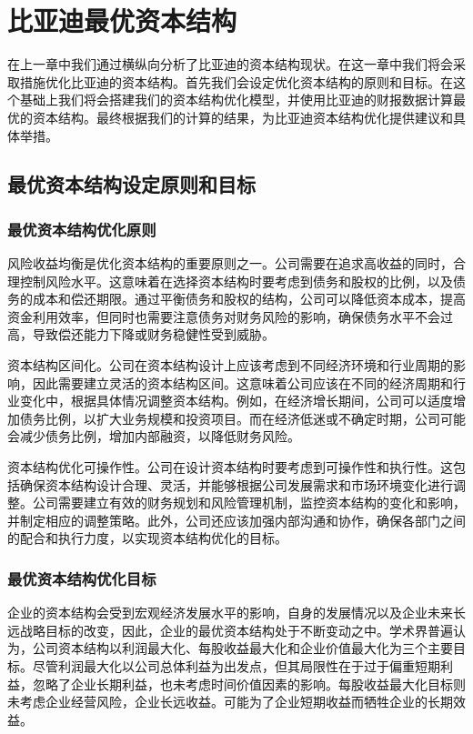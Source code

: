 \chapter{比亚迪最优资本结构}
在上一章中我们通过横纵向分析了比亚迪的资本结构现状。在这一章中我们将会采取措施优化比亚迪的资本结构。首先我们会设定优化资本结构的原则和目标。在这个基础上我们将会搭建我们的资本结构优化模型，并使用比亚迪的财报数据计算最优的资本结构。最终根据我们的计算的结果，为比亚迪资本结构优化提供建议和具体举措。
\section{最优资本结构设定原则和目标}
\subsection{最优资本结构优化原则}
风险收益均衡是优化资本结构的重要原则之一。公司需要在追求高收益的同时，合理控制风险水平。这意味着在选择资本结构时要考虑到债务和股权的比例，以及债务的成本和偿还期限。通过平衡债务和股权的结构，公司可以降低资本成本，提高资金利用效率，但同时也需要注意债务对财务风险的影响，确保债务水平不会过高，导致偿还能力下降或财务稳健性受到威胁。

资本结构区间化。公司在资本结构设计上应该考虑到不同经济环境和行业周期的影响，因此需要建立灵活的资本结构区间。这意味着公司应该在不同的经济周期和行业变化中，根据具体情况调整资本结构。例如，在经济增长期间，公司可以适度增加债务比例，以扩大业务规模和投资项目。而在经济低迷或不确定时期，公司可能会减少债务比例，增加内部融资，以降低财务风险。

资本结构优化可操作性。公司在设计资本结构时要考虑到可操作性和执行性。这包括确保资本结构设计合理、灵活，并能够根据公司发展需求和市场环境变化进行调整。公司需要建立有效的财务规划和风险管理机制，监控资本结构的变化和影响，并制定相应的调整策略。此外，公司还应该加强内部沟通和协作，确保各部门之间的配合和执行力度，以实现资本结构优化的目标。
\subsection{最优资本结构优化目标}
企业的资本结构会受到宏观经济发展水平的影响，自身的发展情况以及企业未来长远战略目标的改变，因此，企业的最优资本结构处于不断变动之中。学术界普遍认为，公司资本结构以利润最大化、每股收益最大化和企业价值最大化为三个主要目标。尽管利润最大化以公司总体利益为出发点，但其局限性在于过于偏重短期利益，忽略了企业长期利益，也未考虑时间价值因素的影响。每股收益最大化目标则未考虑企业经营风险，企业长远收益。可能为了企业短期收益而牺牲企业的长期效益。

